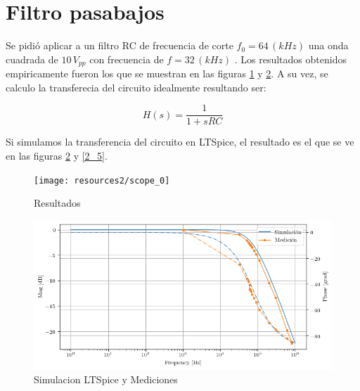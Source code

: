 \section{Filtro pasabajos}

Se pidió aplicar a un filtro RC de frecuencia de corte $f_{0}=64\,(kHz)$
una onda cuadrada de $10\,V_{pp}$ con frecuencia de $f=32\,(kHz)$
. Los resultados obtenidos empiricamente fueron los que se muestran
en las figuras \ref{2_1} y \ref{2_4}. A su vez, se calculo la transferecia
del circuito idealmente resultando ser:

\begin{equation}
H(s)=\frac{1}{1+sRC}\label{eq:2_4}
\end{equation}

Si simulamos la transferencia del circuito en LTSpice, el resultado
es el que se ve en las figuras \ref{2_4} y \ref{2_5}.

\begin{figure}[h]
\begin{centering}
\texttt{[image: resources2/scope\_0]}
\par\end{centering}
\caption{Resultados}
\label{2_1}
\end{figure}

\begin{figure}[h]
\begin{centering}
\includegraphics[scale=0.65]{resources2/MedyPost}
\par\end{centering}
\caption{Simulacion LTSpice y Mediciones}
\label{2_4}

\end{figure}

